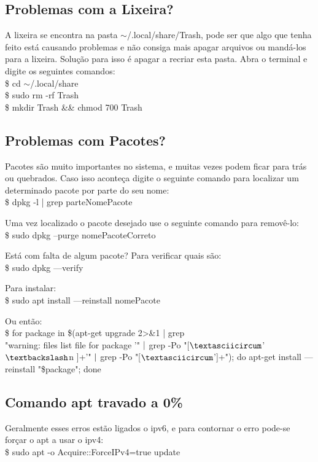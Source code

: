 \subsection{Problemas com a Lixeira?}
A lixeira se encontra na pasta $\sim$/.local/share/Trash, pode ser que algo que tenha feito está causando problemas e não consiga mais apagar arquivos ou mandá-los para a lixeira. Solução para isso é apagar a recriar esta pasta. Abra o terminal e digite os seguintes comandos: \\
{\ttfamily\$ cd $\sim$/.local/share \\
\$ sudo rm -rf Trash \\
\$ mkdir Trash \&\& chmod 700 Trash}

\subsection{Problemas com Pacotes?}
Pacotes são muito importantes no sistema, e muitas vezes podem ficar para trás ou quebrados. Caso isso aconteça digite o seguinte comando para localizar um determinado pacote por parte do seu nome: \\
{\ttfamily\$ dpkg -l | grep parteNomePacote}

Uma vez localizado o pacote desejado use o seguinte comando para removê-lo: \\
{\ttfamily\$ sudo dpkg --purge nomePacoteCorreto}

Está com falta de algum pacote? Para verificar quais são: \\
{\ttfamily\$ sudo dpkg ---verify} 

Para instalar: \\
{\ttfamily\$ sudo apt install ---reinstall nomePacote}

Ou então: \\
{\ttfamily\$ for package in \$(apt-get upgrade 2>\&1 | grep \\ 
"warning: files list file for package '" $\arrowvert$ grep -Po "[$\textasciicircum$'$\textbackslash$n ]+'" $\arrowvert$ grep -Po "[$\textasciicircum$']+"); do apt-get install ---reinstall "\$package"; done}

\subsection{Comando apt travado a 0\%}
Geralmente esses erros estão ligados o ipv6, e para contornar o erro pode-se forçar o apt a usar o ipv4: \\
{\ttfamily\$ sudo apt -o Acquire::ForceIPv4=true update}

